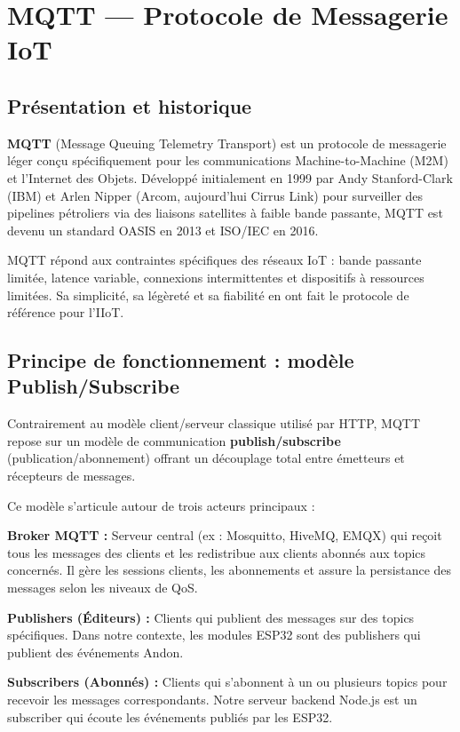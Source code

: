 
\section{MQTT — Protocole de Messagerie IoT}

\subsection{Présentation et historique}

\textbf{MQTT} (Message Queuing Telemetry Transport) est un protocole de messagerie léger conçu spécifiquement pour les communications Machine-to-Machine (M2M) et l'Internet des Objets. Développé initialement en 1999 par Andy Stanford-Clark (IBM) et Arlen Nipper (Arcom, aujourd'hui Cirrus Link) pour surveiller des pipelines pétroliers via des liaisons satellites à faible bande passante, MQTT est devenu un standard OASIS en 2013 et ISO/IEC en 2016.

MQTT répond aux contraintes spécifiques des réseaux IoT : bande passante limitée, latence variable, connexions intermittentes et dispositifs à ressources limitées. Sa simplicité, sa légèreté et sa fiabilité en ont fait le protocole de référence pour l'IIoT.

\subsection{Principe de fonctionnement : modèle Publish/Subscribe}

Contrairement au modèle client/serveur classique utilisé par HTTP, MQTT repose sur un modèle de communication \textbf{publish/subscribe} (publication/abonnement) offrant un découplage total entre émetteurs et récepteurs de messages.


Ce modèle s'articule autour de trois acteurs principaux :

\textbf{Broker MQTT :} Serveur central (ex : Mosquitto, HiveMQ, EMQX) qui reçoit tous les messages des clients et les redistribue aux clients abonnés aux topics concernés. Il gère les sessions clients, les abonnements et assure la persistance des messages selon les niveaux de QoS.

\textbf{Publishers (Éditeurs) :} Clients qui publient des messages sur des topics spécifiques. Dans notre contexte, les modules ESP32 sont des publishers qui publient des événements Andon.

\textbf{Subscribers (Abonnés) :} Clients qui s'abonnent à un ou plusieurs topics pour recevoir les messages correspondants. Notre serveur backend Node.js est un subscriber qui écoute les événements publiés par les ESP32.

